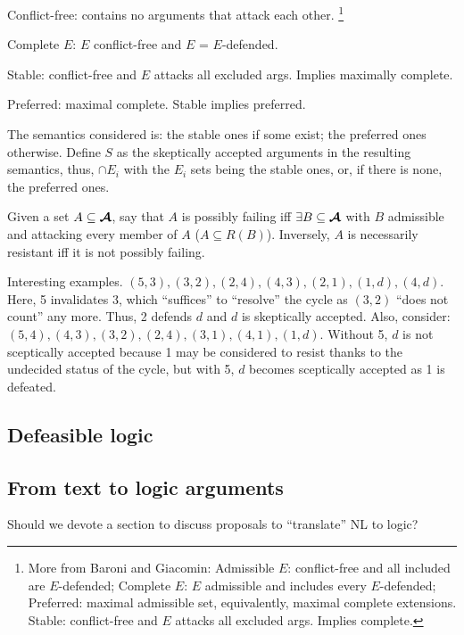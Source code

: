 \documentclass[version=3.21, pagesize, twoside=off, bibliography=totoc, DIV=calc, fontsize=12pt, a4paper, french, english]{scrartcl}
\begin{document}
Conflict-free: contains no arguments that attack each other.
\footnote{More from Baroni and Giacomin: Admissible $E$: conflict-free and all included are $E$-defended; Complete $E$: $E$ admissible and includes every $E$-defended; Preferred: maximal admissible set, equivalently, maximal complete extensions. Stable: conflict-free and $E$ attacks all excluded args. Implies complete.}

Complete $E$: $E$ conflict-free and $E$ = $E$-defended.

Stable: conflict-free and $E$ attacks all excluded args. Implies maximally complete.

Preferred: maximal complete. Stable implies preferred. 

The semantics considered is: the stable ones if some exist; the preferred ones otherwise. Define $S$ as the skeptically accepted arguments in the resulting semantics, thus, $\cap E_i$ with the $E_i$ sets being the stable ones, or, if there is none, the preferred ones.

Given a set $A \subseteq \bm{\mathcal{A}}$, say that $A$ is possibly failing iff $\exists B \subseteq \bm{\mathcal{A}}$ with $B$ admissible and attacking every member of $A$ ($A \subseteq R(B)$).
Inversely, $A$ is necessarily resistant iff it is not possibly failing.

Interesting examples. $(5, 3), (3, 2), (2, 4), (4, 3), (2, 1), (1, d), (4, d)$. Here, 5 invalidates 3, which “suffices” to “resolve” the cycle as $(3, 2)$ “does not count” any more. Thus, 2 defends $d$ and $d$ is skeptically accepted. Also, consider: $(5, 4), (4, 3), (3, 2), (2, 4), (3, 1), (4, 1), (1, d)$. Without 5, $d$ is not sceptically accepted because 1 may be considered to resist thanks to the undecided status of the cycle, but with 5, $d$ becomes sceptically accepted as 1 is defeated.

\subsection{Defeasible logic}

\subsection{From text to logic arguments}
Should we devote a section to discuss proposals to “translate” NL to logic?
\end{document}

